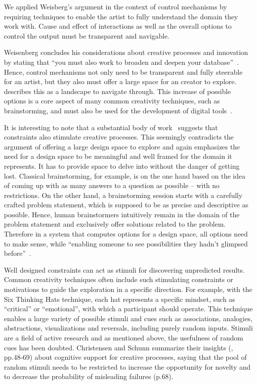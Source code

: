 We applied Weisberg's argument in the context of control mechanisms by requiring techniques to enable the artist to fully understand the domain they work with. Cause and effect of interactions as well as the overall options to control the output must be transparent and navigable.

Weisenberg concludes his considerations about creative processes and innovation by stating that ``you must also work to broaden and deepen your database''~\cite{markman_2009_tis}. Hence, control mechanisms not only need to be transparent and fully steerable for an artist, but they also must offer a large space for an creator to explore. \citeauthor*{boden_2010_cat}~\cite{boden_2010_cat} describes this as a landscape to navigate through. This increase of possible options is a core aspect of many common creativity techniques, such as brainstorming, and must also be used for the development of digital tools~\cite{terry_2004_vea}.

It is interesting to note that a substantial body of work~\cite{onarheim_2010_occ,shih_2011_buc,biskjaer_2014_cud,stokes_2005_ccp} suggests that constraints also stimulate creative processes. This seemingly contradicts the argument of offering a large design space to explore and again emphasizes the need for a design space to be meaningful and well framed for the domain it represents. It has to provide space to delve into without the danger of getting lost. Classical brainstorming, for example, is on the one hand based on the idea of coming up with as many answers to a question as possible – with no restrictions. On the other hand, a brainstorming session starts with a carefully crafted problem statement, which is supposed to be as precise and descriptive as possible. Hence, human brainstormers intuitively remain in the domain of the problem statement and exclusively offer solutions related to the problem. Therefore in a system that computes options for a design space, all options need to make sense, while ``enabling someone to see possibilities they hadn't glimpsed before''~\cite{boden_2010_cat}. 

Well designed constraints can act as stimuli for discovering unpredicted results. Common creativity techniques often include such stimulating constraints or motivations to guide the exploration in a specific direction. For example, with the Six Thinking Hats technique, each hat represents a specific mindset, such as “critical” or “emotional”, with which a participant should operate. This technique enables a large variety of possible stimuli and cues such as associations, analogies, abstractions, visualizations and reversals, including purely random inputs. Stimuli are a field of active research and as mentioned above, the usefulness of random cues has been doubted. Christensen and Schunn summarize their insights (\cite{markman_2009_tis}, pp.48-69) about cognitive support for creative processes, saying that the pool of random stimuli needs to be restricted to increase the opportunity for novelty and to decrease the probability of misleading failures (p.68).

